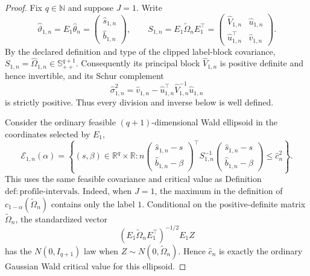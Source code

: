 \documentclass{article}
\begin{document}
\begin{proof}
Fix \(q\in\mathbb N\) and suppose \(J=1\).  Write
\[
 \widehat\vartheta_{1,n}=E_1\widehat\theta_n
   =\begin{pmatrix}\widehat s_{1,n}\\ \widehat b_{1,n}\end{pmatrix},
 \qquad
 S_{1,n}=E_1\widetilde\Omega_nE_1^{\top}
   =\begin{pmatrix}
      \widehat V_{1,n}&\widehat u_{1,n}\\
      \widehat u_{1,n}^{\top}&\widehat v_{1,n}
    \end{pmatrix}.
\]
By the declared definition and type of the clipped label-block covariance, \(S_{1,n}=\widehat\Omega_{1,n}\in\mathbb S_{++}^{q+1}\).  Consequently its principal block \(\widehat V_{1,n}\) is positive definite and hence invertible, and its Schur complement
\[
 \widehat\sigma_{1,n}^{2}
   =\widehat v_{1,n}
     -\widehat u_{1,n}^{\top}\widehat V_{1,n}^{-1}
        \widehat u_{1,n}
\]
is strictly positive.  Thus every division and inverse below is well defined.

Consider the ordinary feasible \((q+1)\)-dimensional Wald ellipsoid in the coordinates selected by \(E_1\),
\[
 \mathcal E_{1,n}(\alpha)
 =\left\{(s,\beta)\in\mathbb R^q\times\mathbb R:
 n\begin{pmatrix}\widehat s_{1,n}-s\\
                   \widehat b_{1,n}-\beta
   \end{pmatrix}^{\!\top}
 S_{1,n}^{-1}
 \begin{pmatrix}\widehat s_{1,n}-s\\
                 \widehat b_{1,n}-\beta
 \end{pmatrix}
 \le \widehat c_n^2\right\}.
\]
This uses the same feasible covariance and critical value as Definition \(\mathrm{def:profile\text{-}intervals}\).  Indeed, when \(J=1\), the maximum in the definition of \(c_{1-\alpha}(\widetilde\Omega_n)\) contains only the label \(1\).  Conditional on the positive-definite matrix \(\widetilde\Omega_n\), the standardized vector
\[
 (E_1\widetilde\Omega_nE_1^{\top})^{-1/2}E_1Z
\]
has the \(N(0,I_{q+1})\) law when \(Z\sim N(0,\widetilde\Omega_n)\).  Hence \(\widehat c_n\) is exactly the ordinary Gaussian Wald critical value for this ellipsoid.


\end{proof}
\end{document}
